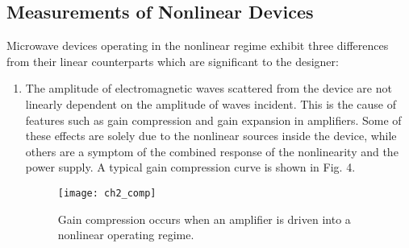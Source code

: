 \documentclass[../thesis.tex]{subfiles}
\begin{document}
\begin{refsection}
\section{Measurements of Nonlinear Devices}

Microwave devices operating in the nonlinear regime exhibit three differences from their linear counterparts which are significant to the designer:
\begin{enumerate}
\item The amplitude of electromagnetic waves scattered from the device are not linearly dependent on the amplitude of waves incident. This is the cause of features such as gain compression and gain expansion in amplifiers. Some of these effects are solely due to the nonlinear sources inside the device, while others are a symptom of the combined response of the nonlinearity and the power supply. A typical gain compression curve is shown in Fig. 4.

\begin{figure}
	\centering
	\texttt{[image: ch2\_comp]}
	\caption{Gain compression occurs when an amplifier is driven into a nonlinear operating regime.}
	\label{ch2_comp}
\end{figure}


\end{enumerate}
\end{refsection}
\end{document}
